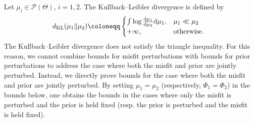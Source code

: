 \documentclass[a4paper]{scrartcl}
\theoremstyle{definition}
\numberwithin{equation}{section}
\newcommand{\rd}{\mathrm{d}}
\newcommand{\KL}[0]{\textup{KL}}
\begin{document}
Let $\mu_i\in\mathcal{P}(\Theta)$, $i=1,2$.
The Kullback--Leibler divergence is defined by
\begin{equation}
  d_\KL(\mu_1\Vert\mu_2)\coloneqq 
 \begin{cases} 
 \int \log \frac{\rd\mu_1}{\rd\mu_2}\rd \mu_1, & \mu_1\ll \mu_2                                  
\\
+\infty, & \text{otherwise.}
 \end{cases}
 \label{eq_Kullback_Leibler_divergence}
\end{equation}
The Kullback--Leibler divergence does not satisfy the triangle inequality.
For this reason, we cannot combine bounds for misfit perturbations with bounds for prior perturbations to address the case where both the misfit and prior are jointly perturbed.
Instead, we directly prove bounds for the case where both the misfit and prior are jointly perturbed.
By setting $\mu_1=\mu_2$ (respectively, $\Phi_1=\Phi_2$) in the bounds below, one obtains the bounds in the cases where only the misfit is perturbed and the prior is held fixed (resp. the prior is perturbed and the misfit is held fixed).
\end{document}
